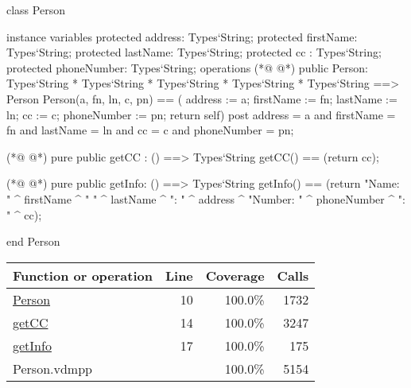 \begin{vdmpp}[breaklines=true]
class Person

instance variables
  protected address: Types`String;
  protected firstName: Types`String;
  protected lastName: Types`String;
  protected cc : Types`String;
  protected phoneNumber: Types`String;
operations
(*@
\label{Person:10}
@*)
 public Person: Types`String * Types`String * Types`String * Types`String * Types`String ==> Person
  Person(a, fn, ln, c, pn) == ( address := a; firstName := fn; lastName := ln; cc := c; phoneNumber := pn; return self)
 post address = a and firstName = fn and lastName = ln and cc = c and phoneNumber = pn;
  
(*@
\label{getCC:14}
@*)
 pure public getCC : () ==> Types`String
  getCC() == (return cc);
  
(*@
\label{getInfo:17}
@*)
 pure public getInfo: () ==> Types`String
  getInfo() == (return "Name: " ^ firstName ^ " " ^ lastName ^ "\nAddress: " ^ address ^ "\nPhone Number: " ^ phoneNumber ^ "\nCC: " ^ cc);

end Person
\end{vdmpp}
\bigskip
\begin{longtable}{|l|r|r|r|}
\hline
Function or operation & Line & Coverage & Calls \\
\hline
\hline
\hyperref[Person:10]{Person} & 10&100.0\% & 1732 \\
\hline
\hyperref[getCC:14]{getCC} & 14&100.0\% & 3247 \\
\hline
\hyperref[getInfo:17]{getInfo} & 17&100.0\% & 175 \\
\hline
\hline
Person.vdmpp & & 100.0\% & 5154 \\
\hline
\end{longtable}

